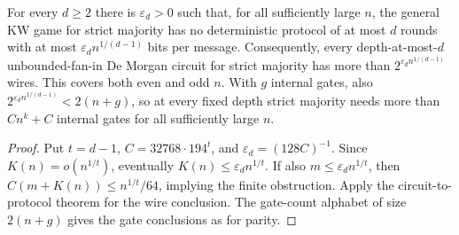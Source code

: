 \begin{theorem}
  \label{thm:lowerbounds-majority-topdown}
  \leanok
  For every $d\ge2$ there is $\varepsilon_d>0$ such that, for all sufficiently
  large $n$, the general KW game for strict majority has no deterministic
  protocol of at most $d$ rounds with at most $\varepsilon_d n^{1/(d-1)}$
  bits per message. Consequently, every depth-at-most-$d$ unbounded-fan-in
  De Morgan circuit for strict majority has more than
  $2^{\varepsilon_d n^{1/(d-1)}}$ wires. This covers both even and odd $n$.
  With $g$ internal gates, also $2^{\varepsilon_d n^{1/(d-1)}} < 2(n + g)$, so
  at every fixed depth strict majority needs more than $Cn^k + C$ internal
  gates for all sufficiently large $n$.
\end{theorem}
\begin{proof}
  \leanok
  Put $t=d-1$, $C=32768\cdot194^t$, and $\varepsilon_d=(128C)^{-1}$.
  Since $K(n)=o(n^{1/t})$, eventually $K(n)\le\varepsilon_d n^{1/t}$.
  If also $m\le\varepsilon_d n^{1/t}$, then
  $C(m+K(n))\le n^{1/t}/64$, implying the finite obstruction.
  Apply the circuit-to-protocol theorem for the wire conclusion.
  The gate-count alphabet of size $2(n+g)$ gives the gate conclusions as for
  parity.
\end{proof}
